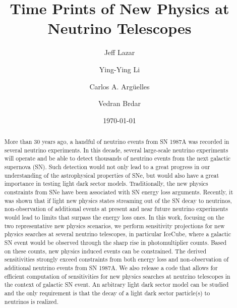 
\title{Time Prints of New Physics at Neutrino Telescopes
}

\author{Jeff Lazar}
\author{Ying-Ying Li}
\author{Carlos A. Arg\"{u}elles}
\author{Vedran Brdar}

\date{\today}

\begin{abstract}
More than 30 years ago, a handful of neutrino events from SN 1987A was recorded in several 
neutrino experiments. In this decade, several large-scale neutrino experiments will operate and be able to detect thousands of neutrino events from the next galactic supernova (SN). Such detection would not only lead to a great progress in our understanding of the astrophysical properties of SNe, but would also have a great importance in testing light dark sector models. Traditionally, the new physics constraints from SNe have been associated with SN energy loss arguments. Recently, it was shown that if light new physics states streaming out of the SN decay to neutrinos, non-observation of additional events at present and near future neutrino experiments would lead to limits that surpass the energy loss ones. In this work, focusing on the two representative new physics scenarios, we perform sensitivity projections for new physics searches at several neutrino telescopes, in particular IceCube, where a galactic SN event would be observed through the sharp rise in  photomultiplier counts. Based on these counts, new physics induced events can be constrained. The derived sensitivities strongly exceed constraints from both energy loss and non-observation of additional neutrino events from SN 1987A. We also release a code that allows for efficient computation of sensitivities for new physics searches at neutrino telescopes in the context of galactic SN event. An arbitrary light dark sector model can be studied and the only requirement is that the decay of a light dark sector particle(s) to neutrinos is realized.      
\end{abstract}

\maketitle